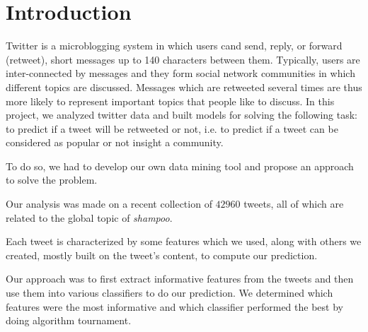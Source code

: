 \section{Introduction}

Twitter is a microblogging system in which users cand send, reply, or forward
(retweet), short messages up to 140 characters between them. Typically, users
are inter-connected by messages and they form social network communities in
which different topics are discussed. Messages which are retweeted several times
are thus more likely to represent important topics that people like to discuss.
In this project, we analyzed twitter data and built models for solving 
the following task: to predict if a tweet will be retweeted or not, i.e. to 
predict if a tweet can be considered as popular or not insight a community.

To do so, we had to develop our own data mining tool and propose an
approach to solve the problem.

Our analysis was made on a recent collection of $42960$ tweets, all of which 
are related to the global topic of \textit{shampoo}.

Each tweet is characterized by some features which we used, along with others 
we created, mostly built on the tweet's content, to compute our prediction.

Our approach was to first extract informative features from the tweets and then 
use them into various classifiers to do our prediction. We determined which 
features were the most informative and which classifier performed the best by 
doing algorithm tournament.
